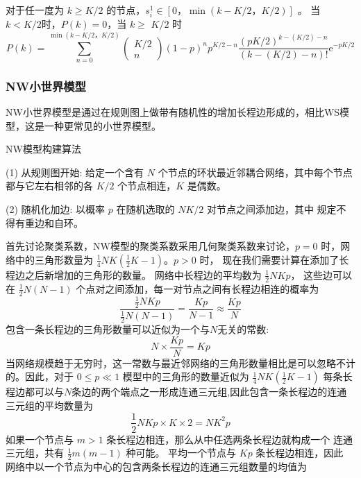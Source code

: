 对于任一度为 $k \geqslant K / 2$ 的节点，$s_i^1 \in[0，\min (k-K / 2，K / 2)]$ 。
当$k<K/2$时，$P(k)=0$，当 $k \geqslant$ $K / 2$ 时
\begin{equation}
    P(k)=\sum_{n=0}^{\min (k-K / 2，K / 2)}\left(\begin{array}{c}
    K / 2 \\
    n
    \end{array}\right)(1-p)^n p^{K / 2-n} \frac{(p K / 2)^{k-(K / 2)-n}}{(k-(K / 2)-n) !} \mathrm{e}^{-p K / 2}
\end{equation}
\subsubsection*{NW小世界模型}
NW小世界模型是通过在规则图上做带有随机性的增加长程边形成的，相比WS模型，这是一种更常见的小世界模型。\par
\noindent NW模型构建算法\par
\noindent(1) 从规则图开始: 给定一个含有 $N$ 个节点的环状最近邻耦合网络，其中每个节点都与它左右相邻的各 $K / 2$ 个节点相连，$K$ 是偶数。\par
\noindent(2) 随机化加边: 以概率 $p$ 在随机选取的 $NK / 2$ 对节点之间添加边，其中 规定不得有重边和自环。\par
首先讨论聚类系数，NW模型的聚类系数采用几何聚类系数来讨论，$p=0$ 时，网络中的三角形数量为 
$\frac{1}{4} N K\left(\frac{1}{2} K-1\right)$。$ p>0$ 时，
现在我们需要计算在添加了长程边之后新增加的三角形的数量。 网络中长程边的平均数为 $\frac{1}{2} N K p$，
这些边可以在 $\frac{1}{2} N(N-1)$ 个点对之间添加，每一对节点之间有长程边相连的概率为
\begin{equation}
    \frac{\frac{1}{2} N K p}{\frac{1}{2} N(N-1)}=\frac{K p}{N-1} \approx \frac{K p}{N}
 \end{equation}
 包含一条长程边的三角形数量可以近似为一个与$N$无关的常数:
 \begin{equation}
    N \times \frac{K p}{N}=K p
\end{equation}
当网络规模趋于无穷时，这一常数与最近邻网络的三角形数量相比是可以忽略不计的。因此，对于 $0 \leqslant p \ll 1$ 
模型中的三角形的数量近似为 $\frac{1}{4} N K\left(\frac{1}{2} K-1\right) $
每条长程边都可以与$N$条边的两个端点之一形成连通三元组,因此包含一条长程边的连通三元组的平均数量为
\begin{equation}
    \frac{1}{2} N K p \times K \times 2=N K^2 p
\end{equation}
如果一个节点与 $m>1$ 条长程边相连，那么从中任选两条长程边就构成一个 连通三元组，共有 $\frac{1}{2} m(m-1)$ 种可能。
平均一个节点与 $K p$ 条长程边相连，因此 网络中以一个节点为中心的包含两条长程边的连通三元组数量的均值为
